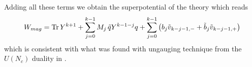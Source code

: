 Adding all these terms we obtain the superpotential of the theory which reads
\begin{equation}
W_{mag} = \mathrm{Tr } \,{Y^{k+1}} + \sum_{j=0}^{k-1} M_j \, \tilde{q} Y^{k-1-j} q + \sum_{j=0}^{k-1} \left( b_{j} \tilde{v}_{k-j-1,-} + \tilde{b}_{j} \tilde{v}_{k-j-1,+}    \right) 
\end{equation}
which is consistent with what was found with ungauging technique from the $U(N_c)$ duality in \cite{Park:2013wta}.


































